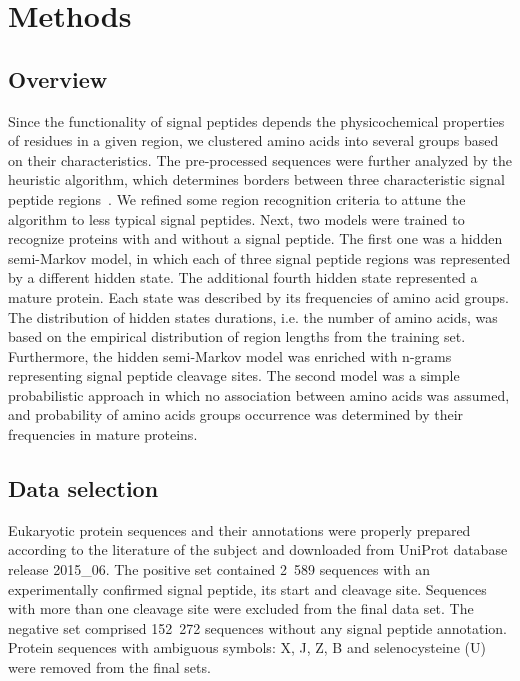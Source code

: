 \documentclass[fleqn,10pt,twoside]{gcb15submission}
\begin{document}
\section*{Methods}

\subsection*{Overview}

Since the functionality of signal peptides depends the physicochemical properties of residues in a given region, we clustered amino acids into several groups based on their characteristics. The pre-processed sequences were further analyzed by the heuristic algorithm, which determines borders between three characteristic signal peptide regions~\cite{1998nielsenprediction}. We refined some region recognition criteria to attune the algorithm to less typical signal peptides. Next, two models were trained to recognize proteins with and without a signal peptide. The first one was a hidden semi-Markov model, in which each of three signal peptide regions was represented by a different hidden state. The additional fourth hidden state represented a mature protein. Each state was described by its frequencies of amino acid groups. The distribution of hidden states durations, i.e. the number of amino acids, was based on the empirical distribution of region lengths from the training set. Furthermore, the hidden semi-Markov model was enriched with n-grams representing signal peptide cleavage sites. The second model was a simple probabilistic approach in which no association between amino acids was assumed, and probability of amino acids groups occurrence was determined by their frequencies in mature proteins.

\subsection*{Data selection}

Eukaryotic protein sequences and their annotations were properly prepared according to the literature of the subject and downloaded from UniProt database release 2015\_06. The positive set contained 2~589 sequences with an experimentally confirmed signal peptide, its start and cleavage site. Sequences with more than one cleavage site were excluded from the final data set. The negative set comprised 152~272 sequences without any signal peptide annotation. Protein sequences with ambiguous symbols: X, J, Z, B and selenocysteine (U) were removed from the final sets.
\end{document}
